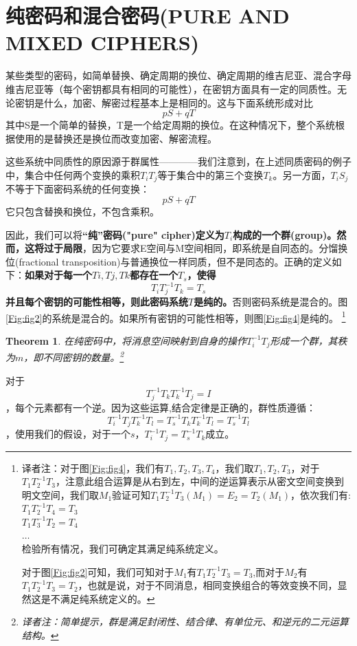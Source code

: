 \documentclass[]{article}
\newtheorem{theorem}{Theorem}
\begin{document}
\section{纯密码和混合密码(PURE AND MIXED CIPHERS)}

某些类型的密码，如简单替换、确定周期的换位、确定周期的维吉尼亚、混合字母维吉尼亚等（每个密钥都具有相同的可能性），在密钥方面具有一定的同质性。无论密钥是什么，加密、解密过程基本上是相同的。这与下面系统形成对比
\[pS+qT\]
其中S是一个简单的替换，T是一个给定周期的换位。在这种情况下，整个系统根据使用的是替换还是换位而改变加密、解密流程。

这些系统中同质性的原因源于群属性————我们注意到，在上述同质密码的例子中，集合中任何两个变换的乘积$T_iT_j$等于集合中的第三个变换$T_k$。另一方面，$T_iS_j$不等于下面密码系统的任何变换：
\[pS+qT\]
它只包含替换和换位，不包含乘积。

因此，我们可以将\textbf{“纯”密码("pure" cipher)定义为$T_i$构成的一个群(group)。然而，这将过于局限}，因为它要求E空间与M空间相同，即系统是自同态的。分馏换位(fractional transposition)与普通换位一样同质，但不是同态的。正确的定义如下：\textbf{如果对于每一个$Ti,Tj,Tk$都存在一个$T_s$，使得
\[T_iT^{-1}_jT_k=T_s\]
并且每个密钥的可能性相等，则此密码系统$T$是纯的。}否则密码系统是混合的。图\ref{Fig:fig2}的系统是混合的。如果所有密钥的可能性相等，则图\ref{Fig:fig4}是纯的。
\footnote{译者注：对于图\ref{Fig:fig4}，我们有$T_1,T_2,T_3,T_4$，我们取$T_1,T_2,T_3$，对于$T_1T_2^{-1}T_3$，注意此组合运算是从右到左，中间的逆运算表示从密文空间变换到明文空间，我们取$M_1$验证可知$T_1T_2^{-1}T_3(M_1)=E_2=T_2(M_1)$，依次我们有:\\
$T_1T_2^{-1}T_4=T_3$\\
$T_1T_3^{-1}T_2=T_4$\\
$\ldots$\\
检验所有情况，我们可确定其满足纯系统定义。\par
对于图\ref{Fig:fig2}可知，我们可知对于$M_1$有$T_1T_2^{-1}T_3=T_3$,而对于$M_2$有$T_1T_2^{-1}T_3=T_2$，也就是说，对于不同消息，相同变换组合的等效变换不同，显然这是不满足纯系统定义的。
}

\begin{theorem}
	在纯密码中，将消息空间映射到自身的操作$T^{-1}_i T_j$形成一个群，其秩为$m$，即不同密钥的数量。\footnote{译者注：简单提示，群是满足封闭性、结合律、有单位元、和逆元的二元运算结构。}
\end{theorem}

对于
\[T^{-1}_j T_k T^{-1}_k T_j =  I\]
，每个元素都有一个逆。因为这些运算,结合定律是正确的，群性质遵循：
\[T^{-1}_i T_j T^{-1}_k T_l = T^{-1}_s T_k T^{-1}_k T_l = T^{-1}_s T_l\]
，使用我们的假设，对于一个$s$，$T^{-1}_i T_j= T^{-1}_s T_k$成立。
\par
\end{document}
